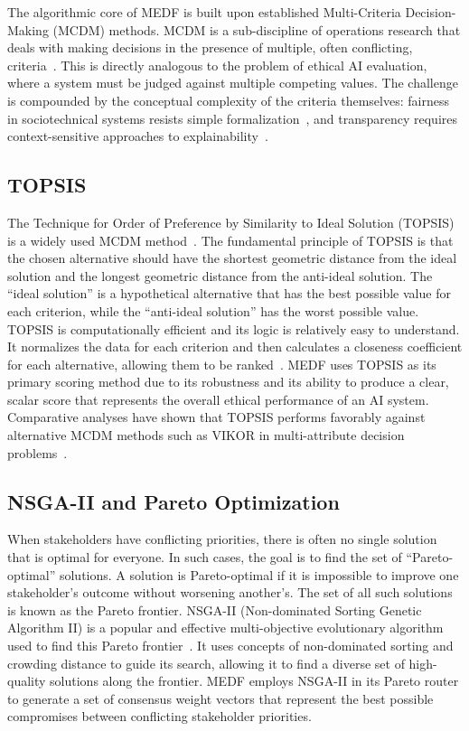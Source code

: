 The algorithmic core of MEDF is built upon established Multi-Criteria Decision-Making (MCDM) methods. MCDM is a sub-discipline of operations research that deals with making decisions in the presence of multiple, often conflicting, criteria~\cite{behzadian2012topsis}. This is directly analogous to the problem of ethical AI evaluation, where a system must be judged against multiple competing values. The challenge is compounded by the conceptual complexity of the criteria themselves: fairness in sociotechnical systems resists simple formalization~\cite{selbst2019fairness,mehrabi2021survey}, and transparency requires context-sensitive approaches to explainability~\cite{arrieta2020explainable}.

\subsection{TOPSIS}
\label{sec:topsis}

The Technique for Order of Preference by Similarity to Ideal Solution (TOPSIS) is a widely used MCDM method~\cite{hwang1981mcdm}. The fundamental principle of TOPSIS is that the chosen alternative should have the shortest geometric distance from the ideal solution and the longest geometric distance from the anti-ideal solution. The \enquote{ideal solution} is a hypothetical alternative that has the best possible value for each criterion, while the \enquote{anti-ideal solution} has the worst possible value. TOPSIS is computationally efficient and its logic is relatively easy to understand. It normalizes the data for each criterion and then calculates a closeness coefficient for each alternative, allowing them to be ranked~\cite{behzadian2012topsis}. MEDF uses TOPSIS as its primary scoring method due to its robustness and its ability to produce a clear, scalar score that represents the overall ethical performance of an AI system. Comparative analyses have shown that TOPSIS performs favorably against alternative MCDM methods such as VIKOR in multi-attribute decision problems~\cite{opricovic2004compromise}.

\subsection{NSGA-II and Pareto Optimization}
\label{sec:nsga2}

When stakeholders have conflicting priorities, there is often no single solution that is optimal for everyone. In such cases, the goal is to find the set of \enquote{Pareto-optimal} solutions. A solution is Pareto-optimal if it is impossible to improve one stakeholder's outcome without worsening another's. The set of all such solutions is known as the Pareto frontier. NSGA-II (Non-dominated Sorting Genetic Algorithm II) is a popular and effective multi-objective evolutionary algorithm used to find this Pareto frontier~\cite{deb2002nsga2}. It uses concepts of non-dominated sorting and crowding distance to guide its search, allowing it to find a diverse set of high-quality solutions along the frontier. MEDF employs NSGA-II in its Pareto router to generate a set of consensus weight vectors that represent the best possible compromises between conflicting stakeholder priorities.

